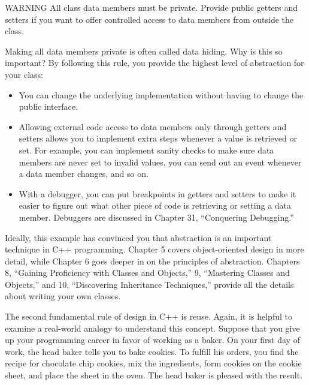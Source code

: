 \begin{myWarning}{WARNING}
All class data members must be private. Provide public getters and setters if you want to offer controlled access to data members from outside the class.
\end{myWarning}

Making all data members private is often called data hiding. Why is this so important? By following this rule, you provide the highest level of abstraction for your class:

\begin{itemize}
\item
You can change the underlying implementation without having to change the public interface.

\item
Allowing external code access to data members only through getters and setters allows you to implement extra steps whenever a value is retrieved or set. For example, you can implement sanity checks to make sure data members are never set to invalid values, you can send out an event whenever a data member changes, and so on.

\item
With a debugger, you can put breakpoints in getters and setters to make it easier to figure out what other piece of code is retrieving or setting a data member. Debuggers are discussed in Chapter 31, “Conquering Debugging.”
\end{itemize}

Ideally, this example has convinced you that abstraction is an important technique in C++ programming. Chapter 5 covers object-oriented design in more detail, while Chapter 6 goes deeper in on the principles of abstraction. Chapters 8, “Gaining Proficiency with Classes and Objects,” 9, “Mastering Classes and Objects,” and 10, “Discovering Inheritance Techniques,” provide all the details about writing your own classes.


The second fundamental rule of design in C++ is reuse. Again, it is helpful to examine a real-world analogy to understand this concept. Suppose that you give up your programming career in favor of working as a baker. On your first day of work, the head baker tells you to bake cookies. To fulfill his orders, you find the recipe for chocolate chip cookies, mix the ingredients, form cookies on the cookie sheet, and place the sheet in the oven. The head baker is pleased with the result.

